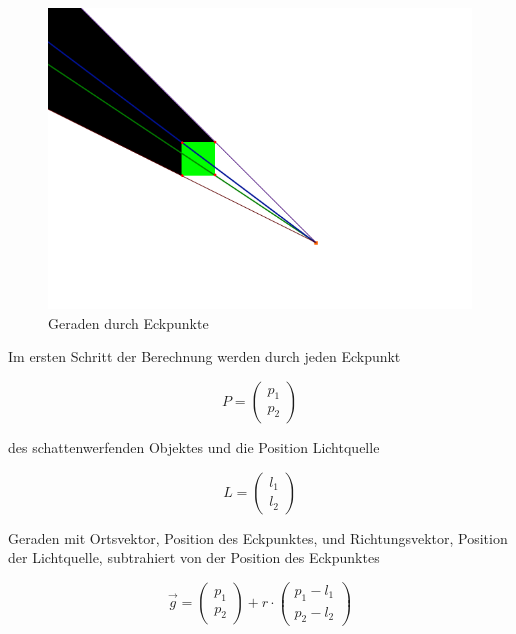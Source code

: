 \begin{figure}[t]
	\centering
	\includegraphics[width=\columnwidth]{images/durchfuehrung_1.png}
	\caption{Geraden durch Eckpunkte}
	\label{fig:durch2}
\end{figure}

Im ersten Schritt der Berechnung werden durch jeden Eckpunkt

\begin{equation}
	P = \left(\begin{array}{c} p_1 \\ p_2 \end{array}\right)
\end{equation}

des schattenwerfenden Objektes und die Position Lichtquelle

\begin{equation}
	L = \left(\begin{array}{c} l_1 \\ l_2 \end{array}\right)
\end{equation}

Geraden mit Ortsvektor, Position des Eckpunktes, und Richtungsvektor, Position der Lichtquelle,
subtrahiert von der Position des Eckpunktes

\begin{equation}
	\vec{g} = \left(\begin{array}{c} p_1 \\ p_2 \end{array}\right) + r \cdot \left(\begin{array}{c} p_1 - l_1 \\ p_2 - l_2 \end{array}\right)
\end{equation}

